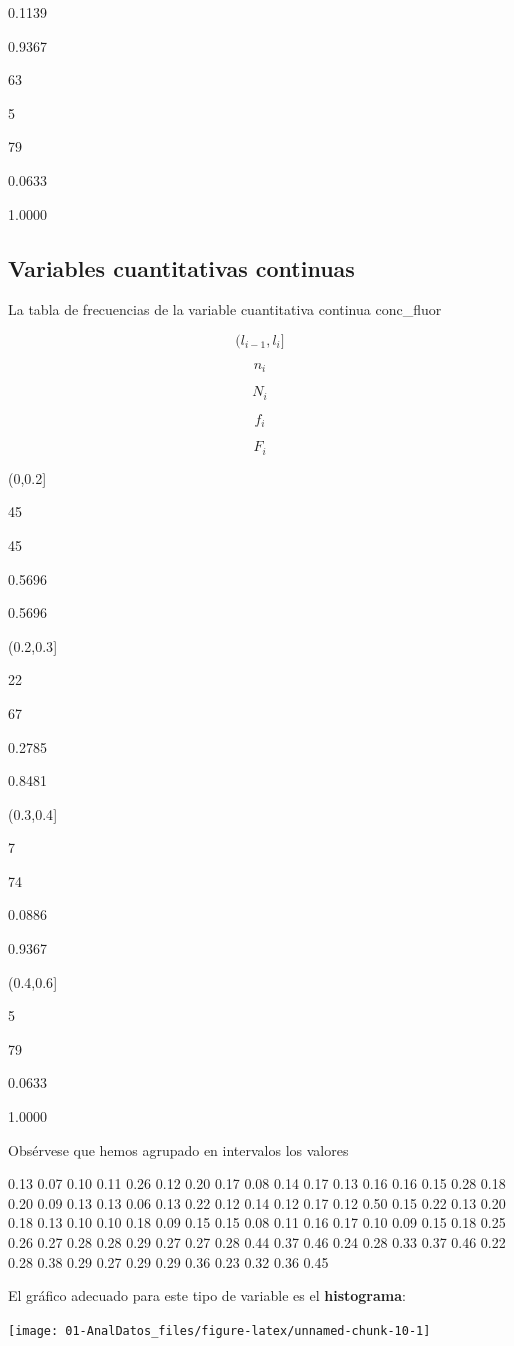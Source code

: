 \documentclass[]{book}
\theoremstyle{definition}
\theoremstyle{definition}
\theoremstyle{definition}
\theoremstyle{remark}
\begin{document}
0.1139

0.9367

63

5

79

0.0633

1.0000

\subsection{Variables cuantitativas
continuas}\label{variables-cuantitativas-continuas}

La tabla de frecuencias de la variable cuantitativa continua conc\_fluor

\[ ( l_{i-1}, l_i ] \]

\[n_i\]

\[N_i\]

\[f_i\]

\[F_i\]

(0,0.2{]}

45

45

0.5696

0.5696

(0.2,0.3{]}

22

67

0.2785

0.8481

(0.3,0.4{]}

7

74

0.0886

0.9367

(0.4,0.6{]}

5

79

0.0633

1.0000

Obsérvese que hemos agrupado en intervalos los valores

0.13 0.07 0.10 0.11 0.26 0.12 0.20 0.17 0.08 0.14 0.17 0.13 0.16 0.16
0.15 0.28 0.18 0.20 0.09 0.13 0.13 0.06 0.13 0.22 0.12 0.14 0.12 0.17
0.12 0.50 0.15 0.22 0.13 0.20 0.18 0.13 0.10 0.10 0.18 0.09 0.15 0.15
0.08 0.11 0.16 0.17 0.10 0.09 0.15 0.18 0.25 0.26 0.27 0.28 0.28 0.29
0.27 0.27 0.28 0.44 0.37 0.46 0.24 0.28 0.33 0.37 0.46 0.22 0.28 0.38
0.29 0.27 0.29 0.29 0.36 0.23 0.32 0.36 0.45

El gráfico adecuado para este tipo de variable es el
\textbf{histograma}:

\begin{center}\texttt{[image: 01-AnalDatos\_files/figure-latex/unnamed-chunk-10-1]} \end{center}
\end{document}
